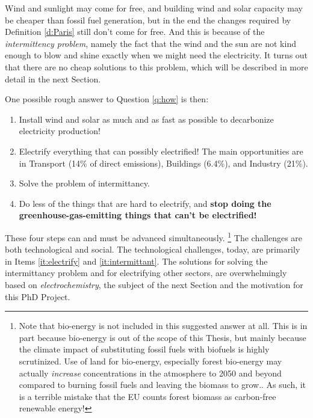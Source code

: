 Wind and sunlight may come for free, and building wind and solar capacity may be cheaper than fossil fuel generation, but in the end the changes required by Definition \ref{d:Paris} still don't come for free. And this is because of the \textit{intermittency problem}, namely the fact that the wind and the sun are not kind enough to blow and shine exactly when we might need the electricity. It turns out that there are no cheap solutions to this problem, which will be described in more detail in the next Section. 

One possible rough answer to Question \ref{q:how} is then:

\begin{enumerate}
	\item Install wind and solar as much and as fast as possible to decarbonize electricity production!
	
	\item Electrify everything that can possibly electrified! The main opportunities are in Transport (14\% of direct  emissions), Buildings (6.4\%), and Industry (21\%). \label{it:electrify}

	\item Solve the problem of intermittancy. \label{it:intermittant}
	
	\item Do less of the things that are hard to electrify, and \textbf{stop doing the greenhouse-gas-emitting things that can't be electrified!} \label{it:sacrifice}
\end{enumerate}

These four steps can and must be advanced simultaneously.
\footnote{Note that bio-energy is not included in this suggested answer at all. This is in part because bio-energy is out of the scope of this Thesis, but mainly because the climate impact of substituting fossil fuels with biofuels is highly scrutinized. Use of land for bio-energy, especially forest bio-energy may actually \textit{increase}  concentrations in the atmosphere to 2050 and beyond compared to burning fossil fuels and leaving the biomass to grow.\cite{Searchinger2018, Bentsen2017}. As such, it is a terrible mistake that the EU counts forest biomass as carbon-free renewable energy!}
The challenges are both technological and social. The technological challenges, today, are primarily in Items \ref{it:electrify} and \ref{it:intermittant}. The solutions for solving the intermittancy problem and for electrifying other sectors, are overwhelmingly based on \textit{electrochemistry}, the subject of the next Section and the motivation for this PhD Project.

